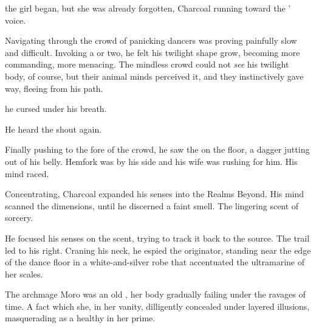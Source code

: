  the girl began, but she was already forgotten, Charcoal running toward the \rinyuth' voice. 

Navigating through the crowd of panicking dancers was proving painfully slow and difficult.  Invoking a \Qliphah{} or two, he felt his twilight shape grow, becoming more commanding, more menacing. The mindless crowd could not \emph{see} his twilight body, of course, but their animal minds perceived it, and they instinctively gave way, fleeing from his path. 

\tho{\Machai,} he cursed under his breath.  

He heard the \rinyuth shout again.   

Finally pushing to the fore of the crowd, he saw the \rayuth on the floor, a dagger jutting out of his belly. \Risvet{} Hemfork was by his side and his wife was rushing for him.  His mind raced. 


Concentrating, Charcoal expanded his senses into the Realms Beyond.  His mind scanned the dimensions, until he discerned a faint smell. The lingering scent of sorcery. 


He focused his senses on the scent, trying to track it back to the source. The trail led to his right. Craning his neck, he espied the originator, standing near the edge of the dance floor in a white-and-silver robe that accentuated the ultramarine of her scales. 

 The archmage Moro \Cornel{} was an old \sphyle{}, her body gradually failing under the ravages of time. A fact which she, in her vanity, dilligently concealed under layered illusions, masquerading as a healthy \sphyle{} in her prime. 

